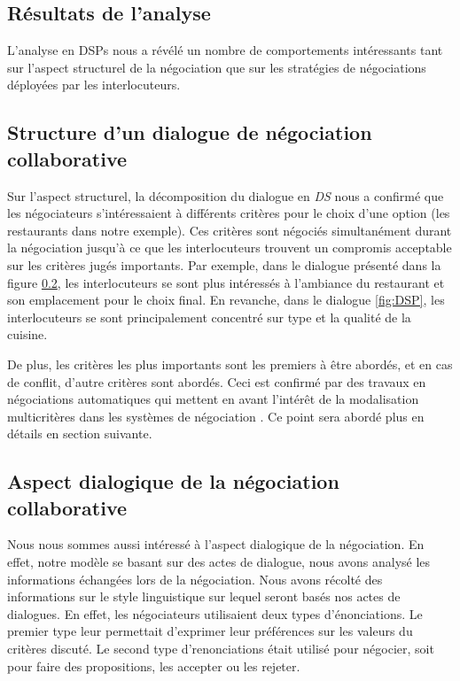 			 
		\subsection{Résultats de l'analyse}
		
			L'analyse en DSPs nous a révélé un nombre de comportements intéressants tant sur l'aspect structurel de la négociation que sur les stratégies de négociations déployées par les interlocuteurs. 	
			
			\subsection{Structure d'un dialogue de négociation collaborative}
			
					Sur l'aspect structurel, la décomposition du dialogue en \emph{DS} nous a confirmé que les négociateurs s'intéressaient à différents critères pour le choix d'une option (les restaurants dans notre exemple). Ces critères sont négociés simultanément durant la négociation jusqu'à ce que les interlocuteurs trouvent un compromis acceptable sur les critères jugés importants. 
					Par exemple, dans le dialogue présenté dans la figure \ref{}, les interlocuteurs se sont plus intéressés à l'ambiance du restaurant et son emplacement pour le choix final. En revanche, dans le dialogue \ref{fig:DSP}, les interlocuteurs se sont principalement concentré sur type et la qualité de la cuisine.
					    
					De plus, les critères les plus importants sont les premiers à être abordés, et en cas de conflit, d'autre critères sont abordés. 
					Ceci est confirmé par des travaux en négociations automatiques qui mettent en avant l'intérêt de la modalisation multicritères dans les systèmes de négociation \cite{jonker2007agent,lai2004literature}. Ce point sera abordé plus en détails en section suivante. 
		
			\subsection{Aspect dialogique de la négociation collaborative}
					 \label{sec:aspectDial}
				 Nous nous sommes aussi intéressé à l'aspect dialogique de la négociation. En effet, notre modèle se basant sur des actes de dialogue, nous avons analysé les informations échangées lors de la négociation. 
				 Nous avons récolté des informations sur le style linguistique sur lequel seront basés nos actes de dialogues. En effet, les négociateurs utilisaient deux types d'énonciations. Le premier type leur permettait d'exprimer leur préférences sur les valeurs du critères discuté. Le second type d'renonciations était utilisé pour négocier, soit pour faire des propositions, les accepter ou les rejeter. 
				 
